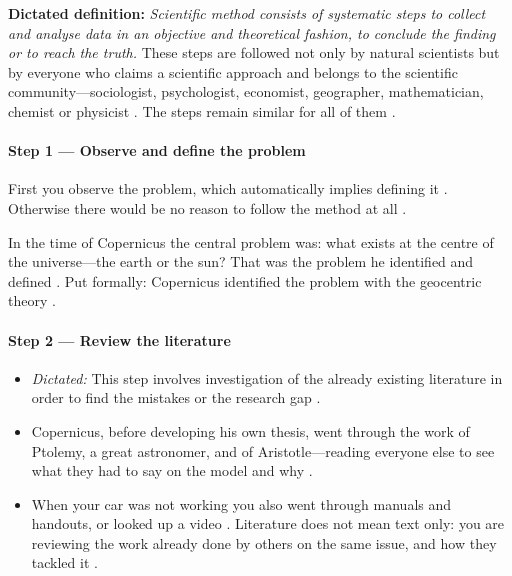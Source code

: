 \begin{KeyConcept}
\textbf{Dictated definition:} \textit{Scientific method consists of systematic steps to collect and analyse data in an objective and theoretical fashion, to conclude the finding or to reach the truth.} 
These steps are followed not only by natural scientists but by everyone who claims a scientific approach and belongs to the scientific community---sociologist, psychologist, economist, geographer, mathematician, chemist or physicist . The steps remain similar for all of them .
\end{KeyConcept}

\paragraph{Step 1 --- Observe and define the problem}
First you observe the problem, which automatically implies defining it . Otherwise there would be no reason to follow the method at all .

\begin{ExampleBox}
In the time of Copernicus the central problem was: what exists at the centre of the universe---the earth or the sun?  That was the problem he identified and defined . Put formally: Copernicus identified the problem with the geocentric theory .
\end{ExampleBox}

\paragraph{Step 2 --- Review the literature}
\begin{itemize}
    \item \textit{Dictated:} This step involves investigation of the already existing literature in order to find the mistakes or the research gap .
    \item Copernicus, before developing his own thesis, went through the work of Ptolemy, a great astronomer, and of Aristotle---reading everyone else to see what they had to say on the model and why .
    \item When your car was not working you also went through manuals and handouts, or looked up a video . Literature does not mean text only: you are reviewing the work already done by others on the same issue, and how they tackled it .
\end{itemize}

